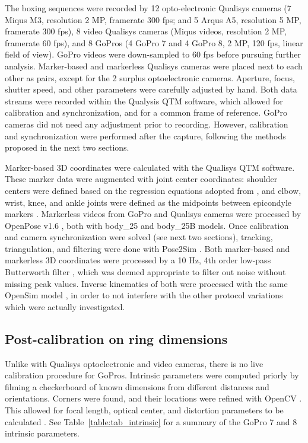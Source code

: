 The boxing sequences were recorded by 12 opto-electronic Qualisys cameras (7 Miqus M3, resolution 2 MP, framerate 300 fps; and 5 Arqus A5, resolution 5 MP, framerate 300 fps), 8 video Qualisys cameras (Miqus videos, resolution 2 MP, framerate 60 fps), and 8 GoPros (4 GoPro 7 and 4 GoPro 8, 2 MP, 120 fps, linear field of view). GoPro videos were down-sampled to 60 fps before pursuing further analysis. Marker-based and markerless Qualisys cameras were placed next to each other as pairs, except for the 2 surplus optoelectronic cameras. Aperture, focus, shutter speed, and other parameters were carefully adjusted by hand. Both data streams were recorded within the Qualysis QTM software, which allowed for calibration and synchronization, and for a common frame of reference. GoPro cameras did not need any adjustment prior to recording. However, calibration and synchronization were performed after the capture, following the methods proposed in the next two sections. 

Marker-based 3D coordinates were calculated with the Qualisys QTM software. These marker data were augmented with joint center coordinates: shoulder centers were defined based on the regression equations adopted from \cite{Dumas2018}, and elbow, wrist, knee, and ankle joints were defined as the midpoints between epicondyle markers \cite{Pohl2010}. Markerless videos from GoPro and Qualisys cameras were processed by OpenPose v1.6 \cite{Cao2019}, both with body\_25 and body\_25B models. Once calibration and camera synchronization were solved (see next two sections), tracking, triangulation, and filtering were done with Pose2Sim \cite{Pagnon2022b}. Both marker-based and markerless 3D coordinates were processed by a 10 Hz, 4th order low-pass Butterworth filter \cite{Butterworth1930}, which was deemed appropriate to filter out noise without missing peak values. Inverse kinematics of both were processed with the same OpenSim model \cite{Pagnon2022b}, in order to not interfere with the other protocol variations which were actually investigated.


\subsection{Post-calibration on ring dimensions}

Unlike with Qualisys optoelectronic and video cameras, there is no live calibration procedure for GoPros. Intrinsic parameters were computed priorly by filming a checkerboard of known dimensions from different distances and orientations. Corners were found, and their locations were refined with OpenCV \cite{Bradski2000}. This allowed for focal length, optical center, and distortion parameters to be calculated \cite{Zhang2000}. See Table~\ref{table:tab_intrinsic} for a summary of the GoPro 7 and 8 intrinsic parameters.

